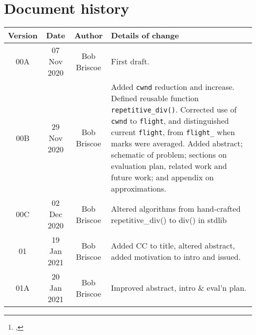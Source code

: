 \documentclass[a4paper,twoside,twocolumn]{article}
\title{\metatitle}%
\author{\metaauthori%
\thanks{\metamaili, %
\metaaddress}%
}
\date{\metadate}%
\newcommand*{\metaversion}{01A}
\newcommand*{\metadate}{20 Jan 2021}
\begin{document}
%


\maketitle%
\thispagestyle{first}

\begin{abstract}
{\small\noindent%
}      %
\end{abstract}

\newpage
{}

{%
\scriptsize%
}

\appendix

\onecolumn%
\section*{Document history}

\begin{tabular}{|c|c|c|p{3.5in}|}
 \hline
Version &Date &Author &Details of change \\
 \hline\hline
00A          &07 Nov 2020&Bob Briscoe &First draft.\\\hline%
00B          &29 Nov 2020&Bob Briscoe &Added \texttt{cwnd} reduction and increase. Defined reusable function \texttt{repetitive\_div()}. Corrected use of \texttt{cwnd} to \texttt{flight}, and distinguished current \texttt{flight}, from \texttt{flight\_} when marks were averaged. Added abstract; schematic of problem; sections on evaluation plan, related work and future work; and appendix on approximations.\\\hline%
00C &02 Dec 2020  &Bob Briscoe &Altered algorithms from hand-crafted repetitive\_div() to div() in stdlib\\\hline%
01           &19 Jan 2021&Bob Briscoe &Added CC to title, altered abstract, added motivation to intro and issued.\\\hline
\metaversion &\metadate  &Bob Briscoe &Improved abstract, intro \& eval'n plan.\\\hline%
\hline%
\end{tabular}
\end{document}
